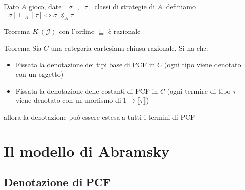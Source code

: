 \documentclass{beamer}
\begin{document}
\begin{frame}
	
	Dato $A$ gioco, date $[\sigma],[\tau]$ classi di strategie di $A$, definiamo
	$[\sigma] \sqsubseteq_A [\tau] \Leftrightarrow \sigma \preccurlyeq_A \tau$ \\
	\begin{block}{Teorema}
		$K_! (\mathcal{G})$ con l'ordine $\sqsubseteq$ è razionale
	\end{block}
	
	\begin{block}{Teorema}
		Sia $C$ una categoria cartesiana chiusa razionale. Si ha che:
		\begin{itemize}
			\item Fissata la denotazione dei tipi base di PCF in $C$ (ogni tipo viene denotato con un oggetto)
			\item Fissata la denotazione delle costanti di PCF in $C$ (ogni termine di tipo $\tau$ viene denotato con un morfismo di $1\rightarrow \llbracket \tau \rrbracket$)
		\end{itemize}
		allora la denotazione può essere estesa a tutti i termini di PCF
		
	\end{block}
	
\end{frame}



\section{Il modello di Abramsky}

\subsection{Denotazione di PCF}
\end{document}

